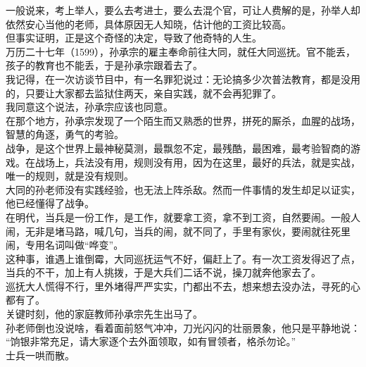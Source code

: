 \begin{multicols}{\theparacolNo}
一般说来，考上举人，要么去考进士，要么去混个官，可让人费解的是，孙举人却依然安心当他的老师，具体原因无人知晓，估计他的工资比较高。\\

但事实证明，正是这个奇怪的决定，导致了他奇特的人生。\\

万历二十七年（1599），孙承宗的雇主奉命前往大同，就任大同巡抚。官不能丢，孩子的教育也不能丢，于是孙承宗跟着去了。\\

我记得，在一次访谈节目中，有一名罪犯说过：无论搞多少次普法教育，都是没用的，只要让大家都去监狱住两天，亲自实践，就不会再犯罪了。\\

我同意这个说法，孙承宗应该也同意。\\

在那个地方，孙承宗发现了一个陌生而又熟悉的世界，拼死的厮杀，血腥的战场，智慧的角逐，勇气的考验。\\

战争，是这个世界上最神秘莫测，最飘忽不定，最残酷，最困难，最考验智商的游戏。在战场上，兵法没有用，规则没有用，因为在这里，最好的兵法，就是实战，唯一的规则，就是没有规则。\\

大同的孙老师没有实践经验，也无法上阵杀敌。然而一件事情的发生却足以证实，他已经懂得了战争。\\

在明代，当兵是一份工作，是工作，就要拿工资，拿不到工资，自然要闹。一般人闹，无非是堵马路，喊几句，当兵的闹，就不同了，手里有家伙，要闹就往死里闹，专用名词叫做“哗变”。\\

这种事，谁遇上谁倒霉，大同巡抚运气不好，偏赶上了。有一次工资发得迟了点，当兵的不干，加上有人挑拨，于是大兵们二话不说，操刀就奔他家去了。\\

巡抚大人慌得不行，里外堵得严严实实，门都出不去，想来想去没办法，寻死的心都有了。\\

关键时刻，他的家庭教师孙承宗先生出马了。\\

孙老师倒也没说啥，看着面前怒气冲冲，刀光闪闪的壮丽景象，他只是平静地说：\\

“饷银非常充足，请大家逐个去外面领取，如有冒领者，格杀勿论。”\\

士兵一哄而散。\\


\end{multicols}
